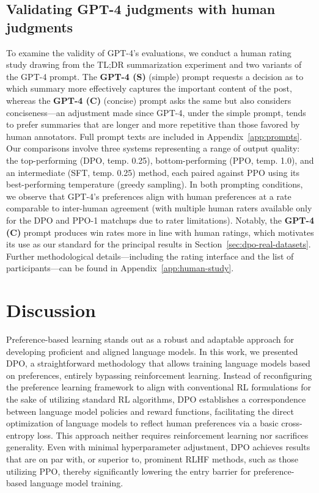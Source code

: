 \subsection{Validating GPT-4 judgments with human judgments}
\label{sec:human-judgments}
To examine the validity of GPT-4’s evaluations, we conduct a human rating study drawing from the TL;DR summarization experiment and two variants of the GPT-4 prompt. The \textbf{GPT-4 (S)} (simple) prompt requests a decision as to which summary more effectively captures the important content of the post, whereas the \textbf{GPT-4 (C)} (concise) prompt asks the same but also considers conciseness—an adjustment made since GPT-4, under the simple prompt, tends to prefer summaries that are longer and more repetitive than those favored by human annotators. Full prompt texts are included in Appendix~\ref{app:prompts}. Our comparisons involve three systems representing a range of output quality: the top-performing (DPO, temp. 0.25), bottom-performing (PPO, temp. 1.0), and an intermediate (SFT, temp. 0.25) method, each paired against PPO using its best-performing temperature (greedy sampling). In both prompting conditions, we observe that GPT-4’s preferences align with human preferences at a rate comparable to inter-human agreement (with multiple human raters available only for the DPO and PPO-1 matchups due to rater limitations). Notably, the \textbf{GPT-4 (C)} prompt produces win rates more in line with human ratings, which motivates its use as our standard for the principal results in Section~\ref{sec:dpo-real-datasets}. Further methodological details—including the rating interface and the list of participants—can be found in Appendix~\ref{app:human-study}.

\section{Discussion}
Preference-based learning stands out as a robust and adaptable approach for developing proficient and aligned language models. In this work, we presented DPO, a straightforward methodology that allows training language models based on preferences, entirely bypassing reinforcement learning. Instead of reconfiguring the preference learning framework to align with conventional RL formulations for the sake of utilizing standard RL algorithms, DPO establishes a correspondence between language model policies and reward functions, facilitating the direct optimization of language models to reflect human preferences via a basic cross-entropy loss. This approach neither requires reinforcement learning nor sacrifices generality. Even with minimal hyperparameter adjustment, DPO achieves results that are on par with, or superior to, prominent RLHF methods, such as those utilizing PPO, thereby significantly lowering the entry barrier for preference-based language model training.

